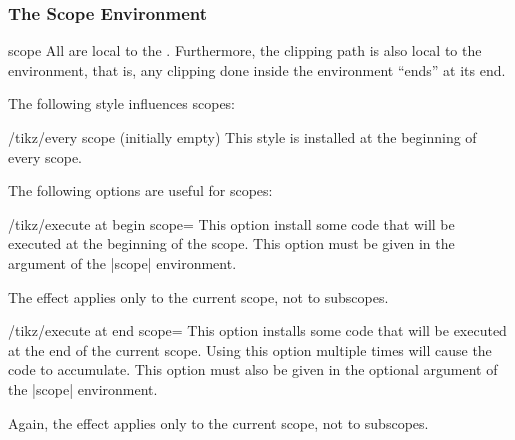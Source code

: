 \subsubsection{The Scope Environment}

\begin{environment}{{scope}}
  All  are local to the . Furthermore, the clipping path is also local to the
  environment, that is, any clipping done inside the environment
  ``ends'' at its end.

\begin{codeexample}[]
\end{codeexample}
  
  The following style influences scopes:
  \begin{stylekey}{/tikz/every scope (initially \normalfont empty)}
    This style is installed at the beginning of every scope.
  \end{stylekey}

  The following options are useful for scopes:
  \begin{key}{/tikz/execute at begin scope=}
    This option install some code that will be executed
    at the beginning of the scope. This option must be
    given in the argument of the |{scope}| environment.

    The effect applies only to the current scope, not to subscopes.
  \end{key}
  \begin{key}{/tikz/execute at end scope=}
    This option installs some code that will be executed
    at the end of the  current scope. Using this option multiple times
    will  cause the code to accumulate. This option must also be given
    in the optional argument of the |{scope}| environment. 

    Again, the effect applies only to the current scope, not to subscopes.
  \end{key}
\end{environment}

